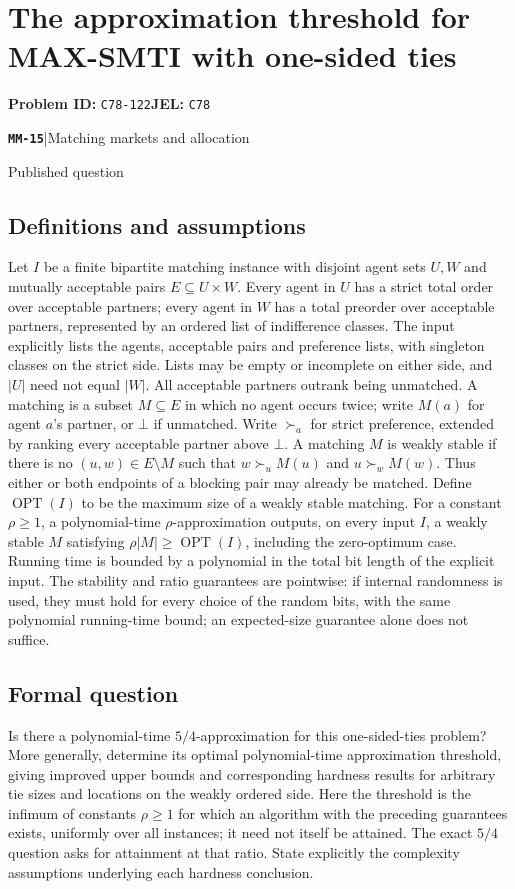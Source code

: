 \documentclass[11pt,a4paper]{article}
\newcommand{\entrymeta}[3]{{\sffamily\small\color{muted}\textbf{\texttt{#1}}\quad|\quad #2\par #3\par}}
\begin{document}
\section*{The approximation threshold for MAX-SMTI with one-sided ties}
\textbf{Problem ID:} \texttt{C78-122}\quad \textbf{JEL:} \texttt{C78}\par
\label{problem:OP-0556}
\label{beyond:MM-15}
\entrymeta{MM-15}{Matching markets and allocation}{Published question}
\subsection*{Definitions and assumptions}
Let $I$ be a finite bipartite matching instance with disjoint agent sets $U,W$ and mutually acceptable pairs $E\subseteq U\times W$. Every agent in $U$ has a strict total order over acceptable partners; every agent in $W$ has a total preorder over acceptable partners, represented by an ordered list of indifference classes. The input explicitly lists the agents, acceptable pairs and preference lists, with singleton classes on the strict side. Lists may be empty or incomplete on either side, and $|U|$ need not equal $|W|$. All acceptable partners outrank being unmatched. A matching is a subset $M\subseteq E$ in which no agent occurs twice; write $M(a)$ for agent $a$'s partner, or $\bot$ if unmatched. Write $\succ_a$ for strict preference, extended by ranking every acceptable partner above $\bot$. A matching $M$ is weakly stable if there is no $(u,w)\in E\setminus M$ such that $w\succ_u M(u)$ and $u\succ_w M(w)$. Thus either or both endpoints of a blocking pair may already be matched. Define $\operatorname{OPT}(I)$ to be the maximum size of a weakly stable matching. For a constant $\rho\ge1$, a polynomial-time $\rho$-approximation outputs, on every input $I$, a weakly stable $M$ satisfying $\rho|M|\ge\operatorname{OPT}(I)$, including the zero-optimum case. Running time is bounded by a polynomial in the total bit length of the explicit input. The stability and ratio guarantees are pointwise: if internal randomness is used, they must hold for every choice of the random bits, with the same polynomial running-time bound; an expected-size guarantee alone does not suffice.
\subsection*{Formal question}
Is there a polynomial-time $5/4$-approximation for this one-sided-ties problem? More generally, determine its optimal polynomial-time approximation threshold, giving improved upper bounds and corresponding hardness results for arbitrary tie sizes and locations on the weakly ordered side. Here the threshold is the infimum of constants $\rho\ge1$ for which an algorithm with the preceding guarantees exists, uniformly over all instances; it need not itself be attained. The exact $5/4$ question asks for attainment at that ratio. State explicitly the complexity assumptions underlying each hardness conclusion.
\end{document}
